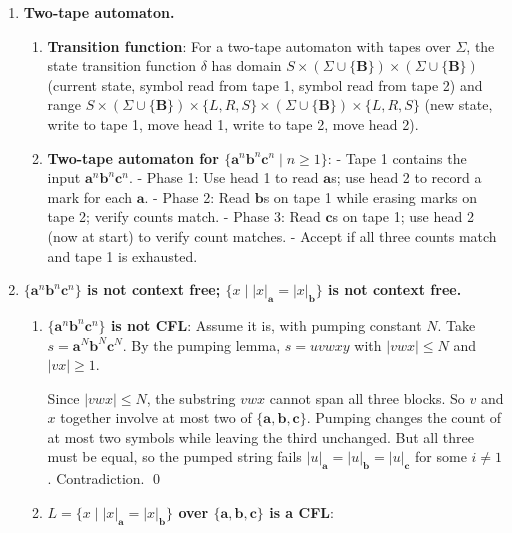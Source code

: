 \begin{enumerate}[{10.}1. ]
So $K$ is not a CFL. \qed

\item \textbf{Two-tape automaton.}

\begin{enumerate}
\item \textbf{Transition function}: For a two-tape automaton with tapes over $\Sigma$, the state transition function $\delta$ has domain $S \times (\Sigma\cup\{\pmb{B}\}) \times (\Sigma\cup\{\pmb{B}\})$ (current state, symbol read from tape 1, symbol read from tape 2) and range $S \times (\Sigma\cup\{\pmb{B}\}) \times \{L,R,S\} \times (\Sigma\cup\{\pmb{B}\}) \times \{L,R,S\}$ (new state, write to tape 1, move head 1, write to tape 2, move head 2).

\item \textbf{Two-tape automaton for $\{\pmb{a}^n\pmb{b}^n\pmb{c}^n \mid n\geq 1\}$}:
- Tape 1 contains the input $\pmb{a}^n\pmb{b}^n\pmb{c}^n$.
- Phase 1: Use head 1 to read $\pmb{a}$s; use head 2 to record a mark for each $\pmb{a}$.
- Phase 2: Read $\pmb{b}$s on tape 1 while erasing marks on tape 2; verify counts match.
- Phase 3: Read $\pmb{c}$s on tape 1; use head 2 (now at start) to verify count matches.
- Accept if all three counts match and tape 1 is exhausted.
\end{enumerate}

\item \textbf{$\{\pmb{a}^n\pmb{b}^n\pmb{c}^n\}$ is not context free; $\{x \mid |x|_{\pmb{a}}=|x|_{\pmb{b}}\}$ is not context free.}

\begin{enumerate}
\item \textbf{$\{\pmb{a}^n\pmb{b}^n\pmb{c}^n\}$ is not CFL}: Assume it is, with pumping constant $N$. Take $s=\pmb{a}^N\pmb{b}^N\pmb{c}^N$. By the pumping lemma, $s=uvwxy$ with $|vwx|\leq N$ and $|vx|\geq 1$.

Since $|vwx|\leq N$, the substring $vwx$ cannot span all three blocks. So $v$ and $x$ together involve at most two of $\{\pmb{a},\pmb{b},\pmb{c}\}$. Pumping changes the count of at most two symbols while leaving the third unchanged. But all three must be equal, so the pumped string fails $|u|_{\pmb{a}}=|u|_{\pmb{b}}=|u|_{\pmb{c}}$ for some $i\neq 1$. Contradiction. \qed

\item \textbf{$L = \{x \mid |x|_{\pmb{a}}=|x|_{\pmb{b}}\}$ over $\{\pmb{a},\pmb{b},\pmb{c}\}$ is a CFL}:


\end{enumerate}
\end{enumerate}
